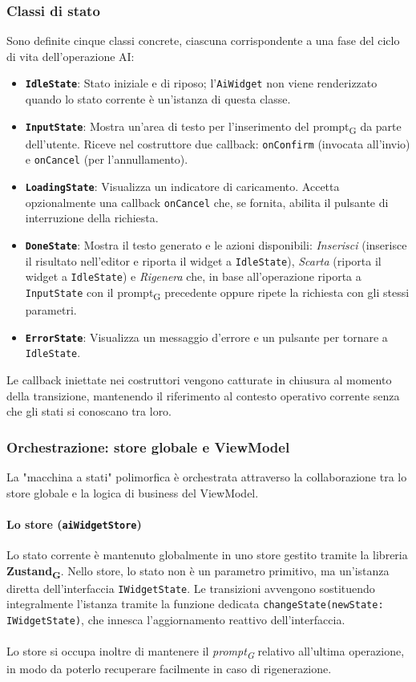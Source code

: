 \documentclass[11pt,a4paper]{article}
\newcommand{\gls}[1]{#1\textsubscript{G}}
\begin{document}
\subsubsection{Classi di stato}
Sono definite cinque classi concrete, ciascuna corrispondente a una fase del ciclo di vita dell'operazione AI:
\begin{itemize}
    \item \textbf{\texttt{IdleState}}: Stato iniziale e di riposo; l'\texttt{AiWidget} non viene renderizzato quando lo stato corrente è un'istanza di questa classe.
    \item \textbf{\texttt{InputState}}: Mostra un'area di testo per l'inserimento del \gls{prompt} da parte dell'utente. Riceve nel costruttore due callback: \texttt{onConfirm} (invocata all'invio) e \texttt{onCancel} (per l'annullamento).
    \item \textbf{\texttt{LoadingState}}: Visualizza un indicatore di caricamento. Accetta opzionalmente una callback \texttt{onCancel} che, se fornita, abilita il pulsante di interruzione della richiesta.
    \item \textbf{\texttt{DoneState}}: Mostra il testo generato e le azioni disponibili: \textit{Inserisci} (inserisce il risultato nell'editor e riporta il widget a \texttt{IdleState}), \textit{Scarta} (riporta il widget a \texttt{IdleState}) e \textit{Rigenera} che, in base all'operazione riporta a \texttt{InputState} con il \gls{prompt} precedente oppure ripete la richiesta con gli stessi parametri.
    \item \textbf{\texttt{ErrorState}}: Visualizza un messaggio d'errore e un pulsante per tornare a \texttt{IdleState}.
\end{itemize}

Le callback iniettate nei costruttori vengono catturate in chiusura al momento della transizione, mantenendo il riferimento al contesto operativo corrente senza che gli stati si conoscano tra loro.


\subsubsection{Orchestrazione: store globale e ViewModel}
La "macchina a stati" polimorfica è orchestrata attraverso la collaborazione tra lo store globale e la logica di business del ViewModel.

\paragraph{Lo store (\texttt{aiWidgetStore})}
Lo stato corrente è mantenuto globalmente in uno store gestito tramite la libreria \textbf{\gls{Zustand}}. Nello store, lo stato non è un parametro primitivo, ma un'istanza diretta dell'interfaccia \texttt{IWidgetState}. Le transizioni avvengono sostituendo integralmente l'istanza tramite la funzione dedicata \texttt{changeState(newState: IWidgetState)}, che innesca l'aggiornamento reattivo dell'interfaccia.\\\\
Lo store si occupa inoltre di mantenere il \textit{\gls{prompt}} relativo all’ultima operazione, in modo da poterlo recuperare facilmente in caso di rigenerazione.
\end{document}

